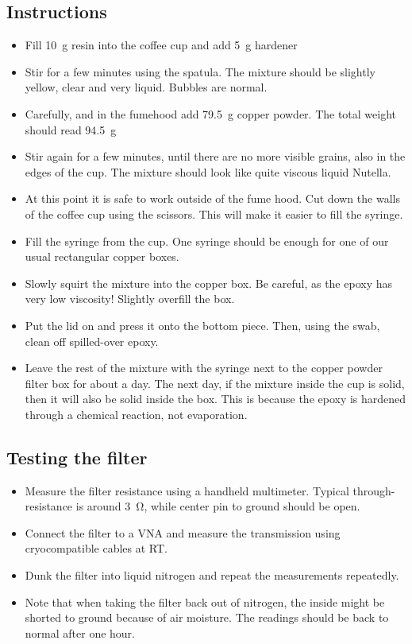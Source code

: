 \subsection{Instructions}
\begin{itemize}
	\item Fill \SI{10}{\gram} resin into the coffee cup and add \SI{5}{\gram} hardener
	\item Stir for a few minutes using the spatula.
	The mixture should be slightly yellow, clear and very liquid.
	Bubbles are normal.
	\item Carefully, and in the fumehood add \SI{79.5}{\gram} copper powder.
	The total weight should read \SI{94.5}{\gram}
	\item Stir again for a few minutes, until there are no more visible grains, also in the edges of the cup.
	The mixture should look like quite viscous liquid Nutella.
	\item At this point it is safe to work outside of the fume hood.
	Cut down the walls of the coffee cup using the scissors.
	This will make it easier to fill the syringe.
	\item Fill the syringe from the cup. 
	One syringe should be enough for one of our usual rectangular copper boxes.
	\item Slowly squirt the mixture into the copper box.
	Be careful, as the epoxy has very low viscosity!
	Slightly overfill the box.
	\item Put the lid on and press it onto the bottom piece. Then, using the swab, clean off spilled-over epoxy.
	\item Leave the rest of the mixture with the syringe next to the copper powder filter box for about a day.
	The next day, if the mixture inside the cup is solid, then it will also be solid inside the box.
	This is because the epoxy is hardened through a chemical reaction, not evaporation.
\end{itemize}

\subsection{Testing the filter}
\begin{itemize}
	\item Measure the filter resistance using a handheld multimeter.
	Typical through-resistance is around \SI{3}{\ohm}, while center pin to ground should be open.
	\item Connect the filter to a VNA and measure the transmission using cryocompatible cables at RT.
	\item Dunk the filter into liquid nitrogen and repeat the measurements repeatedly.
	\item Note that when taking the filter back out of nitrogen, the inside might be shorted to ground because of air moisture.
	The readings should be back to normal after one hour.
\end{itemize}


